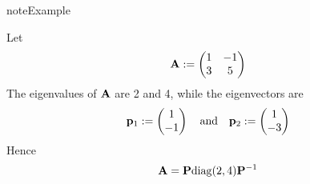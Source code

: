 \documentclass[letterpaper,10pt,english]{jupyterBook}
\begin{document}
\begin{sphinxadmonition}{note}{Example}

\sphinxAtStartPar
Let
\begin{equation*}
\begin{split}
%
{\bf A} :=
\begin{pmatrix}
1 & -1 \\
3 & 5
\end{pmatrix}
%
\end{split}
\end{equation*}
\sphinxAtStartPar
The eigenvalues of \({\bf A}\) are 2 and 4, while the eigenvectors are
\begin{equation*}
\begin{split}
%
{\bf p}_1 :=
\begin{pmatrix}
1 \\
-1
\end{pmatrix}
\quad \text{and} \quad
{\bf p}_2 :=
\begin{pmatrix}
1 \\
-3
\end{pmatrix}
%
\end{split}
\end{equation*}
\sphinxAtStartPar
Hence
\begin{equation*}
\begin{split}
%
{\bf A} = {\bf P} \mathrm{diag}(2, 4) {\bf P}^{-1}
%
\end{split}
\end{equation*}\end{sphinxadmonition}
\end{document}

